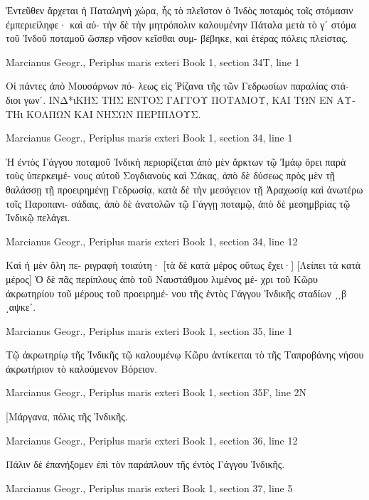 \documentclass[12pt,letterpaper,twoside,final]{memoir}
\begin{document}
\begin{greek}
Ἐντεῦθεν ἄρχεται ἡ Παταληνὴ χώρα, ἧς τὸ πλεῖστον 
ὁ Ἰνδὸς ποταμὸς τοῖς στόμασιν ἐμπεριείληφε· καὶ αὐ-
τὴν δὲ τὴν μητρόπολιν καλουμένην Πάταλα μετὰ τὸ γʹ 
στόμα τοῦ Ἰνδοῦ ποταμοῦ ὥσπερ νῆσον κεῖσθαι συμ-
βέβηκε, καὶ ἑτέρας πόλεις πλείστας. 



Marcianus Geogr., Periplus maris exteri 
Book 1, section 34T, line 1

                        Οἱ πάντες ἀπὸ Μουσάρνων πό-
λεως εἰς Ῥίζανα τῆς τῶν Γεδρωσίων παραλίας στά-
διοι γωνʹ. 
ΙΝΔ*ιΚΗΣ ΤΗΣ ΕΝΤΟΣ ΓΑΓΓΟΥ ΠΟΤΑΜΟΥ, ΚΑΙ ΤΩΝ 
 ΕΝ ΑΥΤΗι ΚΟΛΠΩΝ ΚΑΙ ΝΗΣΩΝ ΠΕΡΙΠΛΟΥΣ. 




Marcianus Geogr., Periplus maris exteri 
Book 1, section 34, line 1

Ἡ ἐντὸς Γάγγου ποταμοῦ Ἰνδικὴ περιορίζεται 
ἀπὸ μὲν ἄρκτων τῷ Ἰμάῳ ὄρει παρὰ τοὺς ὑπερκειμέ-
νους αὐτοῦ Σογδιανοὺς καὶ Σάκας, ἀπὸ δὲ δύσεως πρὸς 
μὲν τῇ θαλάσσῃ τῇ προειρημένῃ Γεδρωσίᾳ, κατὰ δὲ τὴν 
μεσόγειον τῇ Ἀραχωσίᾳ καὶ ἀνωτέρω τοῖς Παροπανι-
σάδαις, ἀπὸ δὲ ἀνατολῶν τῷ Γάγγῃ ποταμῷ, ἀπὸ δὲ 
μεσημβρίας τῷ Ἰνδικῷ πελάγει. 



Marcianus Geogr., Periplus maris exteri 
Book 1, section 34, line 12

                                      Καὶ ἡ μὲν ὅλη πε-
ριγραφὴ τοιαύτη· [τὰ δὲ κατὰ μέρος οὕτως ἔχει·] 
[Λείπει τὰ κατὰ μέρος] 
Ὁ δὲ πᾶς περίπλους ἀπὸ τοῦ Ναυστάθμου λιμένος μέ-  
χρι τοῦ Κῶρυ ἀκρωτηρίου τοῦ μέρους τοῦ προειρημέ-
νου τῆς ἐντὸς Γάγγου Ἰνδικῆς σταδίων ͵͵β ͵αψκεʹ. 



Marcianus Geogr., Periplus maris exteri 
Book 1, section 35, line 1

Τῷ ἀκρωτηρίῳ τῆς Ἰνδικῆς τῷ καλουμένῳ Κῶρυ 
ἀντίκειται τὸ τῆς Ταπροβάνης νήσου ἀκρωτήριον τὸ 
καλούμενον Βόρειον. 



Marcianus Geogr., Periplus maris exteri 
Book 1, section 35F, line 2N

[Μάργανα, πόλις τῆς Ἰνδικῆς. 



Marcianus Geogr., Periplus maris exteri 
Book 1, section 36, line 12

                                                  Πάλιν 
δὲ ἐπανήξομεν ἐπὶ τὸν παράπλουν τῆς ἐντὸς Γάγγου 
Ἰνδικῆς. 



Marcianus Geogr., Periplus maris exteri 
Book 1, section 37, line 5


\end{greek}
\end{document}
